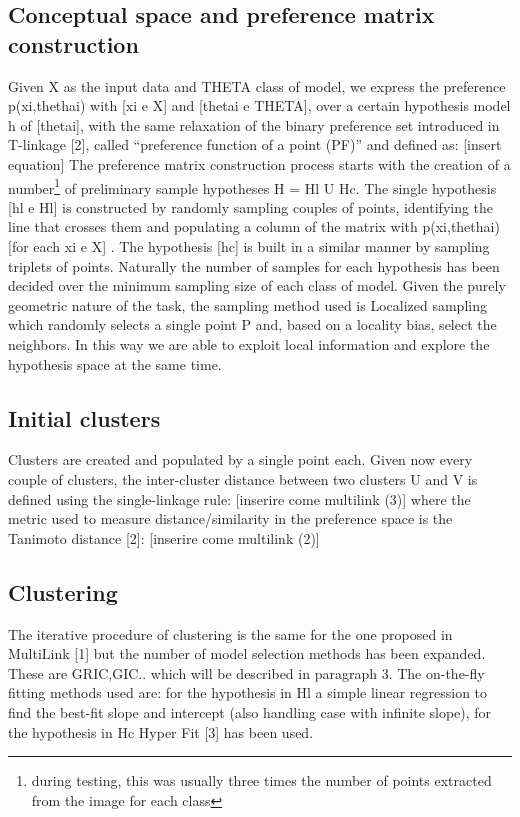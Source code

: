 \documentclass[12pt]{article}
\begin{document}
\subsection{ Conceptual space and preference matrix construction}
Given X as the input data and THETA class of model, we express the preference p(xi,thethai)  with [xi e X] and [thetai e THETA], over a certain hypothesis model h of [thetai], with the same relaxation of the binary preference set introduced in T-linkage [2], called “preference function of a point (PF)” and defined as:
[insert equation]
The preference matrix construction process starts with the creation of a number\footnote{during testing, this was usually three times the number of points extracted from the image for each class} of preliminary sample hypotheses H = Hl U Hc. The single hypothesis [hl e Hl] is constructed by randomly sampling couples of points,  identifying the line that crosses them and populating a column of the matrix with p(xi,thethai)  [for each xi e X] . The hypothesis [hc] is built in a similar manner by sampling triplets of points. Naturally the number of samples for each hypothesis has been decided over the minimum sampling size of each class of model. Given the purely geometric nature of the task, the sampling method used is Localized sampling which randomly selects a single point P and, based on a locality bias, select the neighbors. In this way we are able to exploit local information and explore the hypothesis space at the same time.
\subsection{Initial clusters}
Clusters are created and populated by a single point each.  Given now every couple of clusters, the inter-cluster distance between two clusters U and V is defined using the single-linkage rule:
[inserire come multilink (3)]
where the metric used to measure distance/similarity in the preference space is the Tanimoto distance [2]:
[inserire come multilink (2)]
\subsection{Clustering}
The iterative procedure of clustering is the same for the one proposed in MultiLink [1] but the number of model selection methods has been expanded. These are GRIC,GIC.. which will be described in paragraph 3. The on-the-fly fitting methods used are: for the hypothesis in Hl a simple linear regression to find the best-fit slope and intercept (also handling case with infinite slope), for the hypothesis in Hc Hyper Fit [3] has been used.
\end{document}
